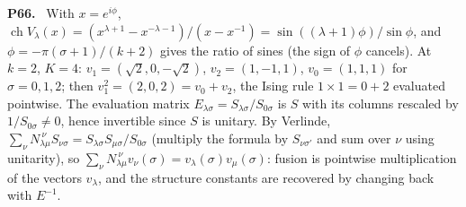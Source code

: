 \documentclass[11pt]{article}
\newenvironment{solution}[1]{\medskip\noindent\textbf{P#1.}\ }{\par\medskip}
\begin{document}
\begin{solution}{66}
With $x = e^{i\phi}$, $\operatorname{ch}V_\lambda(x) = (x^{\lambda+1}-x^{-\lambda-1})/(x-x^{-1}) = \sin((\lambda+1)\phi)/\sin\phi$,
and $\phi = -\pi(\sigma+1)/(k+2)$ gives the ratio of sines (the sign of $\phi$
cancels). At $k = 2$, $K = 4$: $v_1 = (\sqrt2, 0, -\sqrt2)$, $v_2 = (1,-1,1)$,
$v_0 = (1,1,1)$ for $\sigma = 0,1,2$; then $v_1^2 = (2,0,2) = v_0+v_2$, the
Ising rule $1\times1 = 0+2$ evaluated pointwise. The evaluation matrix
$E_{\lambda\sigma} = S_{\lambda\sigma}/S_{0\sigma}$ is $S$ with its columns
rescaled by $1/S_{0\sigma}\ne0$, hence invertible since $S$ is unitary. By
Verlinde, $\sum_\nu N_{\lambda\mu}^{\ \nu}S_{\nu\sigma} = S_{\lambda\sigma}S_{\mu\sigma}/S_{0\sigma}$
(multiply the formula by $S_{\nu\sigma'}$ and sum over $\nu$ using unitarity),
so $\sum_\nu N_{\lambda\mu}^{\ \nu}v_\nu(\sigma) = v_\lambda(\sigma)v_\mu(\sigma)$:
fusion is pointwise multiplication of the vectors $v_\lambda$, and the
structure constants are recovered by changing back with $E^{-1}$.
\end{solution}
\end{document}
